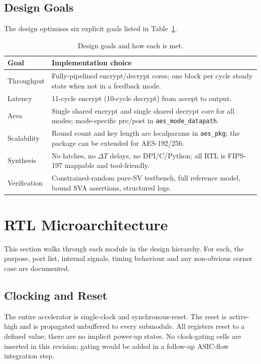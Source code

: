 \documentclass[conference,10pt,a4paper]{IEEEtran}
\begin{document}
\subsection{Design Goals}
The design optimises six explicit goals listed in Table~\ref{tab:goals}.

\begin{table}[t]
\caption{Design goals and how each is met.}
\label{tab:goals}
\centering
\begin{tabular}{p{} p{}}
\toprule
\textbf{Goal} & \textbf{Implementation choice} \\
\midrule
Throughput  & Fully-pipelined encrypt/decrypt cores; one block per cycle
              steady state when not in a feedback mode. \\
Latency     & 11-cycle encrypt (10-cycle decrypt) from accept to output. \\
Area        & Single shared encrypt and single shared decrypt core for
              all modes; mode-specific pre/post in
              \texttt{aes\_mode\_datapath}. \\
Scalability & Round count and key length are localparams in
              \texttt{aes\_pkg}; the package can be extended for
              AES-192/256. \\
Synthesis   & No latches, no $\Delta T$ delays, no DPI/C/Python; all RTL
              is FIPS-197 mappable and tool-friendly. \\
Verification & Constrained-random pure-SV testbench, full reference
              model, bound SVA assertions, structured logs. \\
\bottomrule
\end{tabular}
\end{table}

\section{RTL Microarchitecture}
\label{sec:rtl}

This section walks through each module in the design hierarchy.  For
each, the purpose, port list, internal signals, timing behaviour and any
non-obvious corner case are documented.

\subsection{Clocking and Reset}
The entire accelerator is single-clock and synchronous-reset.  The reset
is active-high and is propagated unbuffered to every submodule.  All
registers reset to a defined value; there are no implicit power-up
states.  No clock-gating cells are inserted in this revision; gating
would be added in a follow-up ASIC-flow integration step.
\end{document}

